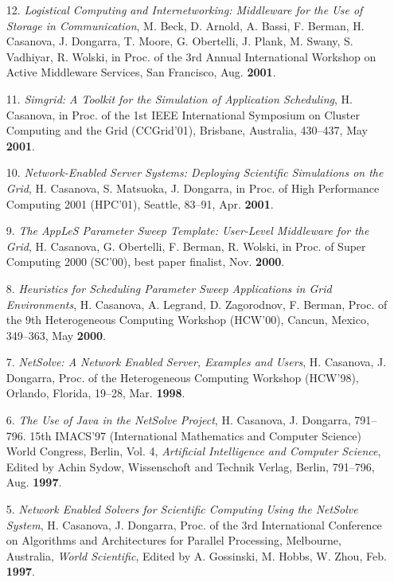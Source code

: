 \begin{enumerate}
\item[12.]
{\it Logistical Computing and Internetworking: Middleware for the Use
of Storage in Communication}, M. Beck, D. Arnold, A. Bassi, F. Berman,
H. Casanova, J. Dongarra, T. Moore, G. Obertelli, J. Plank, M. Swany,
S. Vadhiyar, R. Wolski, in Proc. of the 3rd Annual International
Workshop on Active Middleware Services, San Francisco, Aug. {\bf 2001}.

\item[11.]
{\it Simgrid: A Toolkit for the Simulation of Application Scheduling},
H. Casanova, in Proc. of the 1st IEEE International Symposium
on Cluster Computing and the Grid (CCGrid'01), Brisbane, Australia,
430--437, May {\bf 2001}.

\item[10.]
{\it Network-Enabled Server Systems: Deploying Scientific Simulations on
the Grid}, H. Casanova, S. Matsuoka, J. Dongarra, in Proc. of High
Performance Computing 2001 (HPC'01), Seattle, 83--91, Apr. {\bf 2001}.

\item[9.]
{\it The AppLeS Parameter Sweep Template: User-Level Middleware for the
Grid}, H. Casanova, G. Obertelli, F. Berman, R. Wolski, in Proc.
of Super Computing 2000 (SC'00), best paper finalist, Nov. {\bf 2000}.

\item [8.]
{\it Heuristics for Scheduling Parameter Sweep Applications in Grid
Environments}, H. Casanova, A. Legrand, D. Zagorodnov, F. Berman,
Proc. of the 9th Heterogeneous Computing Workshop (HCW'00), Cancun,
Mexico, 349--363, May {\bf 2000}.

\item[7.]
{\it NetSolve: A Network Enabled Server, Examples and Users}, H. Casanova,
J. Dongarra, Proc. of the Heterogeneous Computing Workshop (HCW'98),
Orlando, Florida, 19--28, Mar. {\bf 1998}.

\item[6.]
{\it The Use of Java in the NetSolve Project}, H. Casanova, J. Dongarra,
791--796.  15th IMACS'97 (International Mathematics and Computer Science)
World Congress, Berlin, Vol. 4, \emph{Artificial Intelligence and Computer
Science}, Edited by Achin Sydow, Wissenschoft and Technik Verlag, Berlin,
791--796, Aug. {\bf 1997}.

\item[5.]
{\it Network Enabled Solvers for Scientific Computing Using the NetSolve
System}, H. Casanova, J. Dongarra, Proc. of the 3rd International
Conference on Algorithms and Architectures for Parallel Processing,
Melbourne, Australia, \emph{World Scientific}, Edited by A. Gossinski,
M. Hobbs, W. Zhou, Feb. {\bf 1997}.


\end{enumerate}
